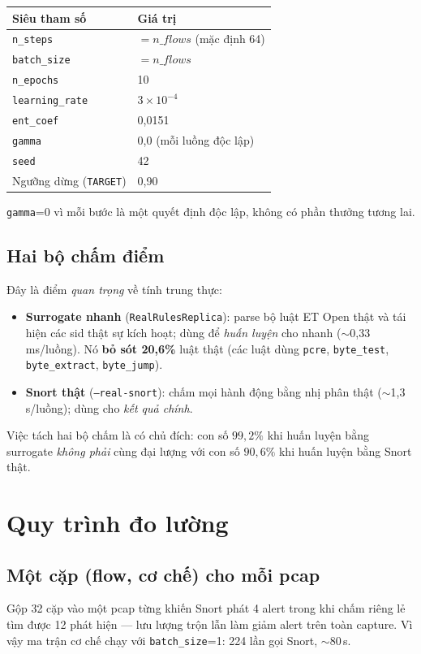\documentclass[12pt,a4paper]{report}
\begin{document}
\begin{center}
\begin{tabular}{ll}
\toprule
Siêu tham số & Giá trị \\
\midrule
\texttt{n\_steps}   & $= n\_flows$ (mặc định 64) \\
\texttt{batch\_size}& $= n\_flows$ \\
\texttt{n\_epochs}  & 10 \\
\texttt{learning\_rate} & $3\times10^{-4}$ \\
\texttt{ent\_coef}  & 0{,}0151 \\
\texttt{gamma}      & 0{,}0 (mỗi luồng độc lập) \\
\texttt{seed}       & 42 \\
Ngưỡng dừng (\texttt{TARGET}) & 0{,}90 \\
\bottomrule
\end{tabular}
\end{center}
\texttt{gamma}=0 vì mỗi bước là một quyết định độc lập, không có phần thưởng tương lai.

\subsection{Hai bộ chấm điểm}
Đây là điểm \emph{quan trọng} về tính trung thực:
\begin{itemize}
  \item \textbf{Surrogate nhanh} (\texttt{RealRulesReplica}): parse bộ luật ET Open thật
        và tái hiện các sid thật sự kích hoạt; dùng để \emph{huấn luyện} cho nhanh
        ($\sim$0{,}33\,ms/luồng). Nó \textbf{bỏ sót 20{,}6\%} luật thật (các luật dùng
        \texttt{pcre}, \texttt{byte\_test}, \texttt{byte\_extract}, \texttt{byte\_jump}).
  \item \textbf{Snort thật} (\texttt{--real-snort}): chấm mọi hành động bằng nhị phân
        thật ($\sim$1{,}3\,s/luồng); dùng cho \emph{kết quả chính}.
\end{itemize}
Việc tách hai bộ chấm là có chủ đích: con số $99{,}2\%$ khi huấn luyện bằng surrogate
\emph{không phải} cùng đại lượng với con số $90{,}6\%$ khi huấn luyện bằng Snort thật.

\section{Quy trình đo lường}

\subsection{Một cặp (flow, cơ chế) cho mỗi pcap}
Gộp 32 cặp vào một pcap từng khiến Snort phát 4 alert trong khi chấm riêng lẻ tìm được
12 phát hiện — lưu lượng trộn lẫn làm giảm alert trên toàn capture. Vì vậy ma trận
cơ chế chạy với \texttt{batch\_size}=1: 224 lần gọi Snort, $\sim$80\,s.
\end{document}
